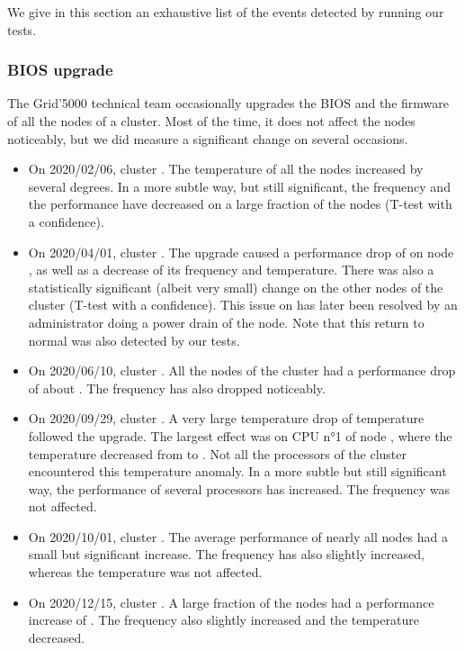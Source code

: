             We give in this section an exhaustive list of the events detected by running our tests.

            \subsubsection{BIOS upgrade}%

                The Grid'5000 technical team occasionally upgrades the BIOS and the firmware of all the nodes of a
                cluster. Most of the time, it does not affect the nodes noticeably, but we did measure a
                significant change on several occasions.
                \begin{itemize}
                    \item On 2020/02/06, cluster \gros. The temperature of all the nodes increased by several
                        degrees. In a more subtle way, but still significant, the frequency and the \dgemm performance
                        have decreased on a large fraction of the nodes (T-test with a  confidence).
                    \item On 2020/04/01, cluster \dahu. The upgrade caused a performance drop of 
                        on node , as well as a decrease of its frequency and temperature. There was also a
                        statistically significant (albeit very small) change on the other nodes of the cluster (T-test
                        with a  confidence). This issue on  has later been resolved by
                        an administrator doing a power drain of the node. Note that this return to normal was also
                        detected by our tests.
                    \item On 2020/06/10, cluster \gros. All the nodes of the cluster had a performance drop of
                        about . The frequency has also dropped noticeably.
                    \item On 2020/09/29, cluster \troll. A very large temperature drop of temperature followed the
                        upgrade. The largest effect was on CPU n°1 of node , where the temperature
                        decreased from  to . Not all the processors of
                        the cluster encountered this temperature anomaly. In a more subtle but still significant way,
                        the \dgemm performance of several processors has increased. The frequency was not affected.
                    \item On 2020/10/01, cluster \gros. The average \dgemm performance of nearly all nodes had a
                        small but significant increase. The frequency has also slightly increased, whereas the
                        temperature was not affected.
                    \item On 2020/12/15, cluster \dahu. A large fraction of the nodes had a performance increase
                        of . The frequency also slightly increased and the temperature decreased.
                \end{itemize}

